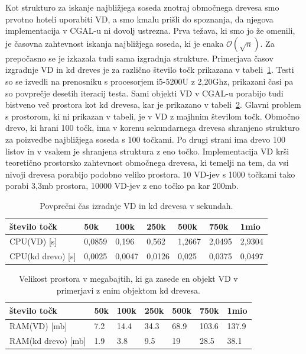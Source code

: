 \documentclass[a4paper, 12pt]{book}
\newcommand{\OO}{\ensuremath{\mathcal{O}}} %
\begin{document}
Kot strukturo za iskanje najbližjega soseda znotraj območnega drevesa smo prvotno hoteli uporabiti VD, a smo kmalu prišli do spoznanja, da njegova implementacija v CGAL-u ni dovolj ustrezna. Prva težava, ki smo jo že omenili, je časovna zahtevnost iskanja najbližjega soseda, ki je enaka $\OO(\sqrt{n})$. Za prepočasno se je izkazala tudi sama izgradnja strukture. Primerjava časov izgradnje VD in kd dreves je za različno število točk prikazana v tabeli~\ref{cpu-compare}. Testi so se izvedli na prenosniku s procesorjem i5-5200U z 2,20Ghz, prikazani časi pa so povprečje desetih iteracij testa. Sami objekti VD v CGAL-u porabijo tudi bistveno več prostora kot kd drevesa, kar je prikazano v tabeli~\ref{ram_compare}. Glavni problem s prostorom, ki ni prikazan v tabeli, je v VD z majhnim številom točk. Območno drevo, ki hrani 100 točk, ima v korenu sekundarnega drevesa shranjeno strukturo za poizvedbe najbližjega soseda s 100 točkami. Po drugi strani ima drevo 100 listov in v vsakem je shranjena struktura z eno točko. Implementacija VD krši teoretično prostorsko zahtevnost območnega drevesa, ki temelji na tem, da vsi nivoji drevesa porabijo podobno veliko prostora. 10 VD-jev s 1000 točkami tako porabi 3,3mb prostora, 10000 VD-jev z eno točko pa kar 200mb.

\begin{table}
\begin{center}
\begin{tabular}{l|l|l|l|l|l|l}
\hline
število točk & 50k & 100k & 250k & 500k & 750k & 1mio \\ \hline \hline
CPU(VD) [s] & 0,0859 & 0,196 & 0,562 & 1,2667 & 2,0495 & 2,9304 \\ \hline
CPU(kd drevo) [s] & 0,0025 & 0,0047 & 0,0126 & 0,025 & 0,0375 & 0,0497
\end{tabular}
\caption{Povprečni čas izradnje VD in kd drevesa v sekundah.}
\label{cpu-compare}
\end{center}
\end{table}

\begin{table}
\begin{center}
\begin{tabular}{l|l|l|l|l|l|l}
število točk & 50k & 100k & 250k & 500k & 750k & 1mio \\ \hline \hline
RAM(VD) [mb] & 7.2 & 14.4 & 34.3 & 68.9 & 103.6 & 137.9 \\ \hline
RAM(kd drevo) [mb] & 1.9 & 3.8 & 9.5 & 19 & 28.5 & 38.1
\end{tabular}
\caption{Velikost prostora v megabajtih, ki ga zasede en objekt VD v primerjavi z enim objektom kd drevesa.}
\label{ram_compare}
\end{center}
\end{table}
\end{document}

